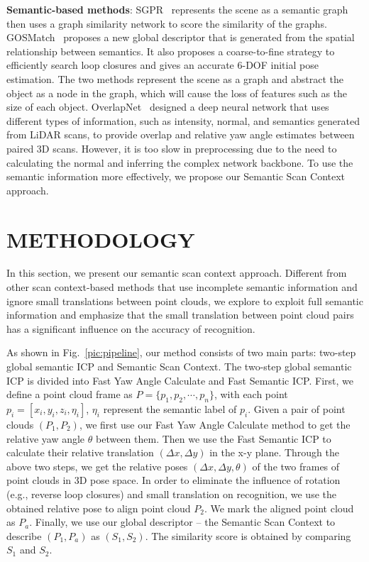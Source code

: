 \documentclass[letterpaper, 10 pt, conference]{ieeeconf}  %
\begin{document}
\textbf{Semantic-based methods}: SGPR~\cite{SGPR} represents the scene as a semantic graph then uses a graph similarity network to score the similarity of the graphs. GOSMatch~\cite{gosmatch} proposes a new global descriptor that is generated from the spatial relationship between semantics. It also proposes a coarse-to-fine strategy to efficiently search loop closures and gives an accurate 6-DOF initial pose estimation. The two methods represent the scene as a graph and abstract the object as a node in the graph, which will cause the loss of features such as the size of each object. OverlapNet~\cite{ON} designed a deep neural network that uses different types of information, such as intensity, normal, and semantics generated from LiDAR scans, to provide overlap and relative yaw angle estimates between paired 3D scans. However, it is too slow in preprocessing due to the need to calculating the normal and inferring the complex network backbone. To use the semantic information more effectively, we propose our Semantic Scan Context approach.



\section{METHODOLOGY}

In this section, we present our semantic scan context approach. Different from other scan context-based methods that use incomplete semantic information and ignore small translations between point clouds, we explore to exploit full semantic information and emphasize that the small translation between point cloud pairs has a significant influence on the accuracy of recognition.


As shown in Fig.~\ref{pic:pipeline}, our method consists of two main parts: two-step global semantic ICP and Semantic Scan Context. The two-step global semantic ICP is divided into Fast Yaw Angle Calculate and Fast Semantic ICP. First, we define a point cloud frame as \( P=\{ p_1,p_2,\cdots,p_n\}\), with each point \( p_i=[x_i,y_i,z_i,\eta_i]\), \(\eta_i\) represent the semantic label of \(p_i\). Given a pair of point clouds \( (P_1, P_2)\), we first use our Fast Yaw Angle Calculate method to get the relative yaw angle \( \theta \) between them. Then we use the Fast Semantic ICP to calculate their relative translation \( (\Delta x, \Delta y)\) in the x-y plane. Through the above two steps, we get the relative poses \( (\Delta x, \Delta y, \theta)\) of the two frames of point clouds in 3D pose space. In order to eliminate the influence of rotation (e.g., reverse loop closures) and small translation on recognition, we use the obtained relative pose to align point cloud \( P_2\). We mark the aligned point cloud as \(P_{a}\). Finally, we use our global descriptor -- the Semantic Scan Context to describe \( (P_1, P_{a})\) as \( (S_1, S_2)\). The similarity score is obtained by comparing \( S_1\) and \(S_2\).
\end{document}
